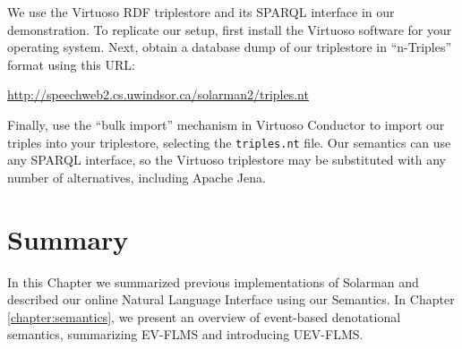 \documentclass[../main.tex]{subfiles}
\begin{document}
We use the Virtuoso RDF triplestore and its SPARQL interface\cite{virtuoso} in our demonstration.  To replicate our setup,
first install the Virtuoso software for your operating system.  Next, obtain a database dump of our triplestore
in ``n-Triples'' format\cite{w3cntriples} using this URL:

\url{http://speechweb2.cs.uwindsor.ca/solarman2/triples.nt}

Finally, use the ``bulk import'' mechanism in Virtuoso Conductor to import our triples into your triplestore, selecting the \texttt{triples.nt} file.
Our semantics can use any SPARQL interface, so the Virtuoso triplestore may be substituted with any number of alternatives, including Apache Jena\cite{jena2013apache}.

\section{Summary}

In this Chapter we summarized previous implementations of Solarman and described our online Natural Language Interface using our Semantics.
In Chapter \ref{chapter:semantics}, we present an overview of event-based denotational semantics, summarizing EV-FLMS and introducing UEV-FLMS.
\end{document}
